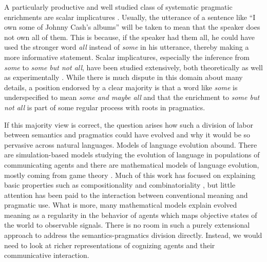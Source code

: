 \documentclass[a4paper]{article}
\begin{document}
A particularly productive and well studied class of systematic pragmatic enrichments are scalar
implicatures
\citep{horn:1984,Hirschberg1985:A-Theory-of-Sca,LevinsonPragmatics1983,Geurts2010:Quantity-Implic}. Usually,
the utterance of a sentence like ``I own some of Johnny Cash's albums'' will be taken to mean
that the speaker does not own all of them. This is because, if the speaker had them all, he
could have used the stronger word \emph{all} instead of \emph{some} in his utterance, 
thereby making a more informative statement. Scalar implicatures, especially the
inference from \emph{some} to \emph{some but not all}, have been studied extensively, both
theoretically
\citep[e.g.,][]{Sauerland2004:Scalar-Implicat,ChierchiaFox2008:The-Grammatical,Rooyvan-RooijJagerde-Jager2012:Explaining-Quan}
as well as experimentally
\citep[e.g.,][]{BottNoveck2004:Some-Utterances,huang+snedeker:2009,GrodnerKlein2010:Some-and-Possib,GoodmanStuhlmuller2013:Knowledge-and-I,DegenTanenhaus2012:Processing-Scal}. While
there is much dispute in this domain about many details, a position endorsed by a
clear majority is that a word like \emph{some} is underspecified to mean \emph{some and maybe
  all} and that the enrichment to \emph{some but not all} is part of some regular 
process with roots in pragmatics.

If this majority view is correct, the question arises how such a division of labor between
semantics and pragmatics could have evolved and why it would be so pervasive across natural languages. Models of language evolution abound. There are
simulation-based models studying the evolution of language in populations of communicating
agents
\citep{Hurford1989:Biological-Evol,Steels1995:A-Self-Organizi,LenaertsJansen2005:The-Evolutionar,SteelsBelpaeme2005:Coordinating-Pe,BaronchelliPuglisi2008:Cultural-route-,steels:2011,SpikeStadler2016:Minimal-Require}
and there are mathematical models of language evolution, mostly coming from game theory
\citep{lewis:1969,Warneryd1993:Cheap-Talk-Coor,BlumeKim1993:Evolutionary-St,nowak+krakauer:1999,Huttegger2007:Evolution-and-t,Skyrms2010:Signals}. Much of this work has focused on explaining basic properties such as compositionality and combinatoriality
\citep[e.g.,][]{Batali1998:Computational-S,nowak+krakauer:1999,nowak+etal:2000,KirbyHurford2002:The-Emergence-o,kirby:2002,SmithKirby2003:Iterated-Learni,Gong2007:Language-Evolut,kirby+etal:2015,verhoef+etal:2014,Franke2015:Proto-Syntax}, but
little attention has been paid to the interaction between conventional meaning and pragmatic
use. What is more, many mathematical models explain evolved meaning as a regularity in the
behavior of agents which maps objective states of the world to observable signals. There is no
room in such a purely extensional approach to address the semantics-pragmatics division
directly. Instead, we would need to look at richer representations of cognizing agents and their
communicative interaction.
\end{document}
